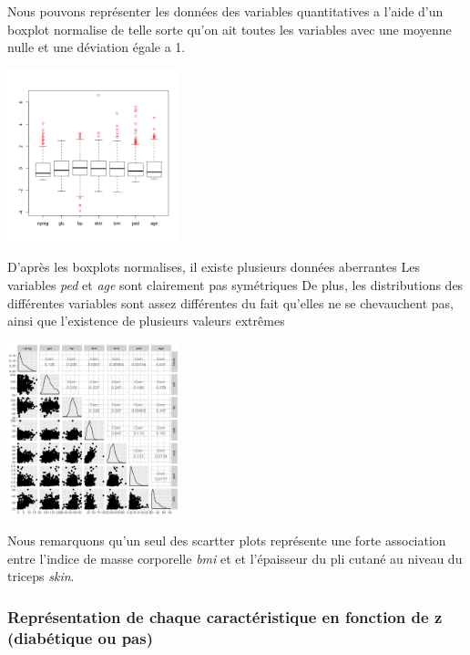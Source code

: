 \documentclass[10pt]{article}
\begin{document}
Nous pouvons représenter les données des variables quantitatives a l'aide d'un boxplot normalise de telle sorte qu'on ait toutes les variables avec une moyenne nulle et une déviation égale a 1.
\begin{center}
	\includegraphics[width=50mm]{Figures/Pima/boxplot_norm_Pimaquant.png}
	\label{fig:boxplot_norm_pima_quantitatives}
\end{center}
D'après les boxplots normalises, il existe plusieurs données aberrantes Les variables \textit{ped} et \textit{age} sont clairement pas symétriques De plus, les distributions des différentes variables sont assez différentes du fait qu'elles ne se chevauchent pas, ainsi que l'existence de plusieurs valeurs extrêmes
\begin{center}
	\includegraphics[width=50mm]{Figures/Pima/plot_Pimaquant.png}
	\label{fig:plot_pima_quantitatives}
\end{center}

Nous remarquons qu'un seul des scartter plots représente une forte association entre l'indice de masse corporelle \textit{bmi} et et l'épaisseur du pli cutané au niveau du triceps \textit{skin}.
\subsubsection{Représentation de chaque caractéristique en fonction de z (diabétique ou pas)}
\end{document}
